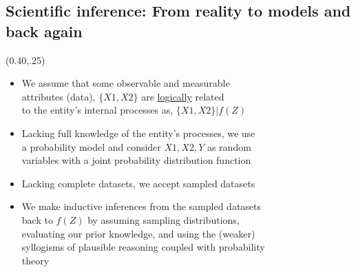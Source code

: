 \documentclass[
paper=128mm:96mm, %
fontsize=11pt, %
pagesize, %
parskip=half-, %
]{scrartcl}
\theoremstyle{mythmstyle} %
\begin{document}
 
\clearpage




\subsection{Scientific inference: From reality to models and back again}

 
 \begin{textblock}{1}(0.40,.25)
  \scriptsize {
  \begin{itemize}
  	\item We assume that some observable and measurable \\
  	attributes (data), $\{X1, X2\}$ are \underline{logically} related \\
  	 to the entity's internal processes as, $\{X1, X2\} | f(Z) $ 
  	\item Lacking full knowledge of the entity's processes, we use \\
  	a probability model and consider $X1, X2, Y$ as random \\
  	variables with a joint probability distribution function
  	\item Lacking complete datasets, we accept sampled datasets
  	\item We make inductive inferences from the sampled datasets \\
  	back to	$f(Z)$ by assuming sampling distributions, \\
  	evaluating our prior knowledge, and using the (weaker) \\
  	syllogisms of plausible reasoning coupled with probability \\
  	theory
  \end{itemize}
  }
 \end{textblock}
 
 \clearpage
 
 
 

\end{document}
